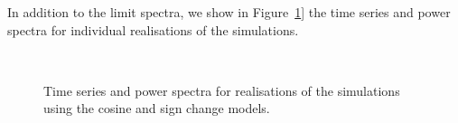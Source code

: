 In addition to the limit spectra, we show in Figure~\ref{fig:artificial_sim_outs}] the time series and power spectra for individual realisations of the simulations.


\begin{figure}[!ht]
	\centering
	\qquad
	 \\
	
	\qquad
	
	\qquad
	
	\caption{Time series and power spectra for realisations of the simulations using the cosine and sign change models.}
	\label{fig:artificial_sim_outs}
\end{figure}

